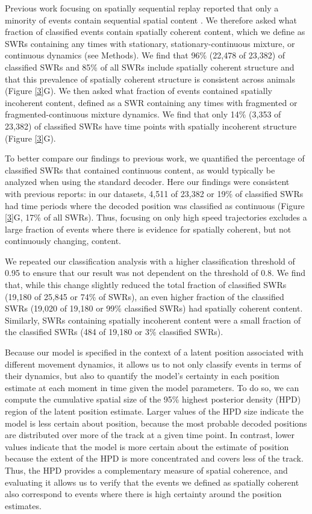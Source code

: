 \documentclass[times, twoside]{zHenriquesLab-StyleBioRxiv}
\begin{document}
Previous work focusing on spatially sequential replay reported that only a minority of events contain sequential spatial content \cite{KarlssonAwakereplayremote2009, FosterReversereplaybehavioural2006, DavidsonHippocampalReplayExtended2009}. We therefore asked what fraction of classified events contain spatially coherent content, which we define as SWRs containing any times with stationary, stationary-continuous mixture, or continuous dynamics (see Methods). We find that 96\% (22,478 of 23,382) of classified SWRs and 85\% of all SWRs include spatially coherent structure and that this prevalence of spatially coherent structure is consistent across animals (Figure \ref{3}G). We then asked what fraction of events contained spatially incoherent content, defined as a SWR containing any times with fragmented or fragmented-continuous mixture dynamics. We find that only 14\% (3,353 of 23,382) of classified SWRs have time points with spatially incoherent structure (Figure \ref{3}G).

To better compare our findings to previous work, we quantified the percentage of classified SWRs that contained continuous content, as would typically be analyzed when using the standard decoder. Here our findings were consistent with previous reports: in our datasets, 4,511 of 23,382 or 19\% of classified SWRs had time periods where the decoded position was classified as continuous (Figure \ref{3}G, 17\% of all SWRs). Thus, focusing on only high speed trajectories excludes a large fraction of events where there is evidence for spatially coherent, but not continuously changing, content.

We repeated our classification analysis with a higher classification threshold of 0.95 to ensure that our result was not dependent on the threshold of 0.8. We find that, while this change slightly reduced the total fraction of classified SWRs (19,180 of 25,845 or 74\% of SWRs), an even higher fraction of the classified SWRs (19,020 of 19,180 or 99\% classified SWRs) had spatially coherent content. Similarly, SWRs containing spatially incoherent content were a small fraction of the classified SWRs (484 of 19,180 or 3\% classified SWRs).

Because our model is specified in the context of a latent position associated with different movement dynamics, it allows us to not only classify events in terms of their dynamics, but also to quantify the model's certainty in each position estimate at each moment in time given the model parameters. To do so, we can compute the cumulative spatial size of the 95\% highest posterior density (HPD) region of the latent position estimate. Larger values of the HPD size indicate the model is less certain about position, because the most probable decoded positions are distributed over more of the track at a given time point. In contrast, lower values indicate that the model is more certain about the estimate of position because the extent of the HPD is more concentrated and covers less of the track. Thus, the HPD provides a complementary measure of spatial coherence, and evaluating it allows us to verify that the events we defined as spatially coherent also correspond to events where there is high certainty around the position estimates. 
\end{document}
